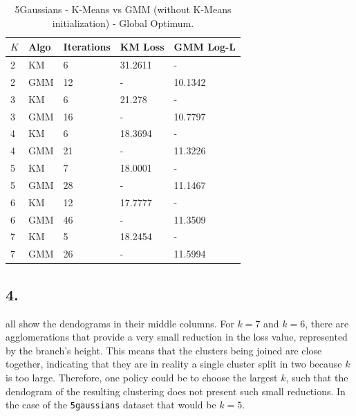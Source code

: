 \documentclass[a4paper,11pt]{article}
\begin{document}
\begin{table}
    \centering
    \begin{tabularx}{\textwidth}{X|X|X|X|X}
        $K$ & Algo & Iterations & KM Loss & GMM Log-L \\
        \hline
        2   & KM   & 6          & 31.2611      & - \\
        2   & GMM  & 12         & -            & 10.1342 \\
        
        3   & KM   & 6          & 21.278       & - \\
        3   & GMM  & 16         & -            & 10.7797 \\
        
        4   & KM   & 6          & 18.3694      & - \\
        4   & GMM  & 21         & -            & 11.3226 \\
        
        5   & KM   & 7          & 18.0001      & - \\
        5   & GMM  & 28         & -            & 11.1467 \\
        
        6   & KM   & 12         & 17.7777      & - \\
        6   & GMM  & 46         & -            & 11.3509 \\
        
        7   & KM   & 5          & 18.2454      & - \\
        7   & GMM  & 26         & -            & 11.5994
    \end{tabularx}
    \caption{\small{5Gaussians - K-Means vs GMM (without K-Means initialization) - Global Optimum.}}
    \label{tab:assignment7_2}
\end{table}

\subsection*{4.}

 all show the dendograms in their middle columns.
For $k=7$ and $k=6$, there are agglomerations that provide a very small reduction in the loss value, represented by the branch's height.
This means that the clusters being joined are close together, indicating that they are in reality a single cluster split in two because $k$ is too large.
Therefore, one policy could be to choose the largest $k$, such that the dendogram of the resulting clustering does not present such small reductions. In the case of the \verb|5gaussians| dataset that would be $k=5$.
\end{document}
